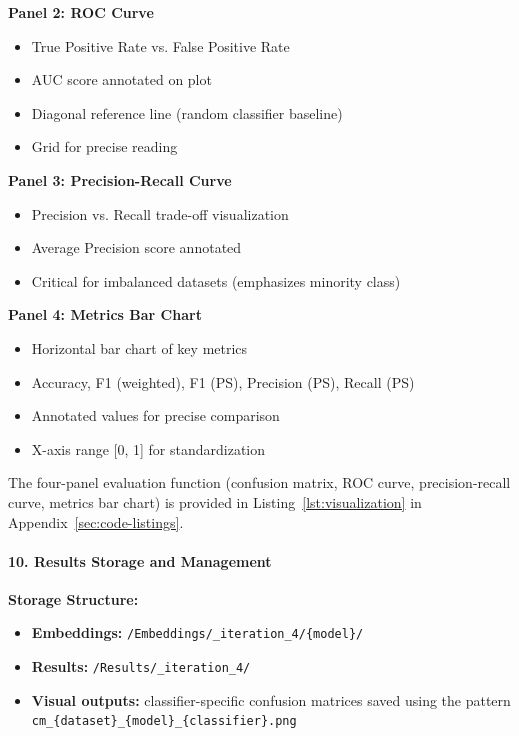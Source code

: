 \documentclass[11pt, titlepage, bibliography=totoc]{scrreprt}
\begin{document}
\textbf{Panel 2: ROC Curve}
\begin{itemize}
    \item True Positive Rate vs. False Positive Rate
    \item AUC score annotated on plot
    \item Diagonal reference line (random classifier baseline)
    \item Grid for precise reading
\end{itemize}

\textbf{Panel 3: Precision-Recall Curve}
\begin{itemize}
    \item Precision vs. Recall trade-off visualization
    \item Average Precision score annotated
    \item Critical for imbalanced datasets (emphasizes minority class)
\end{itemize}

\textbf{Panel 4: Metrics Bar Chart}
\begin{itemize}
    \item Horizontal bar chart of key metrics
    \item Accuracy, F1 (weighted), F1 (PS), Precision (PS), Recall (PS)
    \item Annotated values for precise comparison
    \item X-axis range [0, 1] for standardization
\end{itemize}

The four-panel evaluation function (confusion matrix, ROC curve, precision-recall curve, metrics bar chart) is provided in Listing~\ref{lst:visualization} in Appendix~\ref{sec:code-listings}.

\paragraph{10. Results Storage and Management}
\textbf{Storage Structure:}
\begin{itemize}
    \item \textbf{Embeddings:} \texttt{/Embeddings/\_iteration\_4/\{model\}/}
\item \textbf{Results:} \texttt{/Results/\_iteration\_4/}
\item \textbf{Visual outputs:} classifier-specific confusion matrices saved using the pattern \texttt{cm\_\{dataset\}\_\{model\}\_\{classifier\}.png}
\end{itemize}
\end{document}
